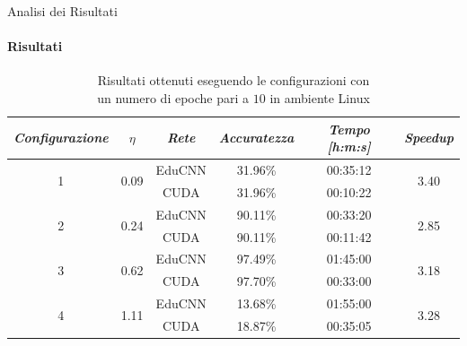 \documentclass[
 ]{beamer}
\begin{document}

\begin{frame}{Analisi dei Risultati}
    \framesubtitle{Risultati}

        \begin{table}
            \centering
            \renewcommand\arraystretch{1.3}
            \small
            \begin{tabular}{| c | c | c | c | c | c |}
                \hline
                \emph{Configurazione} & $\eta$ & \emph{Rete} & \emph{Accuratezza} & \emph{Tempo [h:m:s]} & \emph{Speedup} \\
                \hline
                \multirow{2}{*}{1} & \multirow{2}{*}{0.09} & EduCNN & 31.96\% & 00:35:12 & \multirow{2}{*}{3.40} \\ \cline{3-5} 
                                   &                       & CUDA   & 31.96\% & 00:10:22 & \\
                \hline
                \multirow{2}{*}{2} & \multirow{2}{*}{0.24} & EduCNN & 90.11\% & 00:33:20 & \multirow{2}{*}{2.85} \\ \cline{3-5} 
                                   &                       & CUDA   & 90.11\% & 00:11:42 & \\
                \hline
                \multirow{2}{*}{3} & \multirow{2}{*}{0.62} & EduCNN & 97.49\% & 01:45:00 & \multirow{2}{*}{3.18} \\ \cline{3-5} 
                                   &                       & CUDA   & 97.70\% & 00:33:00 & \\
                \hline
                \multirow{2}{*}{4} & \multirow{2}{*}{1.11} & EduCNN & 13.68\% & 01:55:00 & \multirow{2}{*}{3.28} \\ \cline{3-5} 
                                   &                       & CUDA   & 18.87\% & 00:35:05 & \\
                \hline
            \end{tabular}
            \caption            
    {Risultati ottenuti eseguendo le configurazioni con \\ un numero di epoche pari a $10$ in ambiente Linux\endtabular}          
        \end{table}    
\end{frame}
\end{document}
